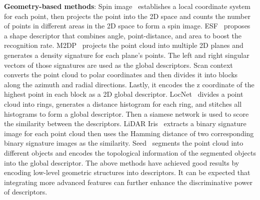 \documentclass[letterpaper, 10 pt, conference]{ieeeconf}  %
\begin{document}
\textbf{Geometry-based methods}: Spin image~\cite{spin} establishes a local coordinate system for each point, then projects the point into the 2D space and counts the number of points in different areas in the 2D space to form a spin image. ESF~\cite{ESF} proposes a shape descriptor that combines angle, point-distance, and area to boost the recognition rate. M2DP~\cite{M2DP} projects the point cloud into multiple 2D planes and generates a density signature for each plane's points. The left and right singular vectors of those signatures are used as the global descriptors. Scan context~\cite{SC,SC1} converts the point cloud to polar coordinates and then divides it into blocks along the azimuth and radial directions. Lastly, it encodes the z coordinate of the highest point in each block as a 2D global descriptor. LocNet~\cite{locnet} divides a point cloud into rings, generates a distance histogram for each ring, and stitches all histograms to form a global descriptor. Then a siamese network is used to score the similarity between the descriptors. LiDAR Iris~\cite{LI} extracts a binary signature image for each point cloud then uses the Hamming distance of two corresponding binary signature images as the similarity. Seed~\cite{seed} segments the point cloud into different objects and encodes the topological information of the segmented objects into the global descriptor. The above methods have achieved good results by encoding low-level geometric structures into descriptors. It can be expected that integrating more advanced features can further enhance the discriminative power of descriptors.
\end{document}
